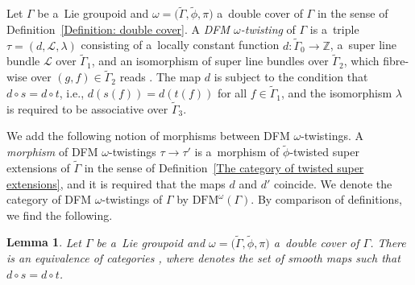\documentclass[10pt,a4paper]{amsart}
\numberwithin{equation}{section}
\newtheorem{Lemma}[Theorem]{Lemma}
\def\Z {\mathbb{Z}}
\begin{document}
\begin{Definition} \label{definition: DFM-twisting}
 Let $\Gamma$ be a~Lie groupoid and $\omega=\bigl(\tilde\Gamma,\tilde\phi,\pi\bigr)$ a~double cover of $\Gamma$ in the sense of Definition~\ref{Definition: double cover}.
 A \emph{DFM $\omega$-twisting} of $\Gamma$ is a~triple $\tau = (d,\mathcal{L},\lambda)$ consisting of a~locally constant function
 $d \colon \tilde\Gamma_0 \to \mathbb{Z}$, a~super line bundle $\mathcal{L}$ over $\tilde\Gamma_1$,
 and an isomorphism of super line bundles over $\tilde\Gamma_2$, which fibre-wise over $(g,f) \in \tilde\Gamma_2$ reads
.
 The map $d$ is subject to the condition that $d \circ s=d\circ t$, i.e.,
 $d(s(f)) = d(t(f))$ for all $f \in \tilde\Gamma_1$, and the isomorphism $\lambda$ is required
 to be associative over $\tilde\Gamma_3$.
\end{Definition}

We add the following notion of morphisms between DFM $\omega$-twistings.
 A \emph{morphism} of DFM $\omega$-twistings
 $\tau \to \tau'$ is a~morphism of $\tilde \phi$-twisted super extensions of $\tilde\Gamma$ in the sense of Definition~\ref{The category of twisted super extensions}, and it is required that the maps $d$ and $d'$ coincide.
We denote the category of DFM $\omega$-twistings of $\Gamma$ by $\mathrm{DFM}^\omega(\Gamma)$.
By comparison of definitions, we find the following.

\begin{Lemma} \label{lemma: DFM twistings via FM category}
 Let $\Gamma$ be a~Lie groupoid and $\omega=\bigl(\tilde\Gamma,\tilde\phi,\pi\bigr)$ a~double cover of $\Gamma$.
 There is an equivalence of categories
\smash{$
 \mathrm{DFM}(\Gamma)^\omega \cong C^{\infty}\bigl(\tilde \Gamma,\Z\bigr)_{\rm dis} \times \mathrm{FM}\bigl(\tilde\Gamma,\tilde\phi\bigr)$},
where \smash{$C^{\infty}\bigl(\tilde \Gamma,\Z\bigr)$} denotes the set of smooth maps \smash{$d \colon \tilde\Gamma_0 \to \Z$} such that $d \circ s=d\circ t$.
\end{Lemma}
\end{document}
